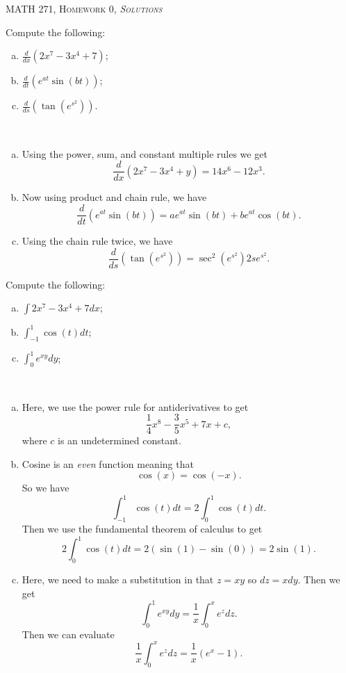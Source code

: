 \documentclass[12pt]{article} %
\begin{document}
\begin{center}
   \textsc{\large MATH 271, Homework 0, \emph{Solutions}}
\end{center}


\begin{problem}
    Compute the following:
\begin{enumerate}[(a)]
    \item $\displaystyle{\frac{d}{dx}(2x^7-3x^4+7)}$;
    \item $\displaystyle{\frac{d}{dt}\left(e^{at}\sin(bt)\right)}$;
    \item $\displaystyle{\frac{d}{ds}\left(\tan\left( e^{s^2}\right)\right)}$.
\end{enumerate}
\end{problem}

\begin{solution}~
\begin{enumerate}[(a)]
    \item Using the power, sum, and constant multiple rules we get
    \[
    \frac{d}{dx}\left( 2x^7 -3x^4 +y\right) = 14x^6-12x^3.
    \]
    \item Now using product and chain rule, we have
    \[
    \frac{d}{dt}\left( e^{at}\sin(bt)\right)= ae^{at}\sin(bt)+be^{at}\cos(bt).
    \]
    \item Using the chain rule twice, we have
    \[
    \frac{d}{ds} \left( \tan\left( e^{s^2}\right)\right) = \sec^2\left(e^{s^2}\right)2se^{s^2}.
    \]
\end{enumerate}
\end{solution}

\newpage

\begin{problem}
    Compute the following:
\begin{enumerate}[(a)]
    \item $\displaystyle{\int 2x^7-3x^4+7dx}$;
    \item $\displaystyle{\int_{-1}^1 \cos(t) dt}$;
    \item $\displaystyle{\int_0^1 e^{xy}dy}$;
\end{enumerate}
\end{problem}

\begin{solution}
~
\begin{enumerate}[(a)]
    \item Here, we use the power rule for antiderivatives to get
    \[
    \frac{1}{4} x^8 - \frac{3}{5} x^5 + 7x + c,
    \]
    where $c$ is an undetermined constant.
    \item Cosine is an \emph{even} function meaning that
    \[
    \cos(x)=\cos(-x).
    \]
    So we have
    \[
    \int_{-1}^1 \cos(t) dt = 2\int_0^1 \cos(t)dt.
    \]
    Then we use the fundamental theorem of calculus to get
    \[
    2\int_0^1 \cos(t)dt = 2 ( \sin(1)-\sin(0))=2\sin(1).
    \]
    \item Here, we need to make a substitution in that $z=xy$ so $dz=xdy$. Then we get
    \[
    \int_0^1 e^{xy}dy = \frac{1}{x} \int_0^xe^{z}dz.
    \]
    Then we can evaluate
    \[
    \frac{1}{x}\int_0^x e^z dz = \frac{1}{x}\left(e^x-1\right).
    \]
\end{enumerate}
\end{solution}
\end{document}
